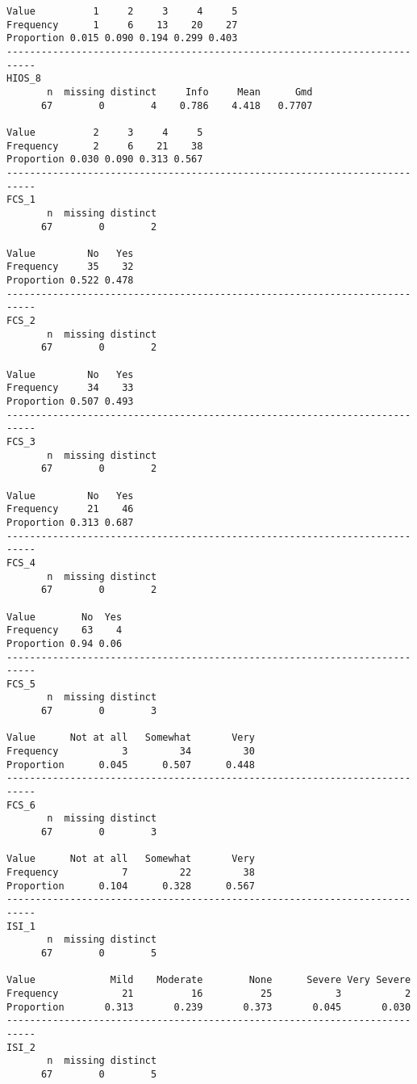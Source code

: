 \documentclass[]{article}
\begin{document}
\begin{verbatim}
Value          1     2     3     4     5
Frequency      1     6    13    20    27
Proportion 0.015 0.090 0.194 0.299 0.403
---------------------------------------------------------------------------
HIOS_8 
       n  missing distinct     Info     Mean      Gmd 
      67        0        4    0.786    4.418   0.7707 
                                  
Value          2     3     4     5
Frequency      2     6    21    38
Proportion 0.030 0.090 0.313 0.567
---------------------------------------------------------------------------
FCS_1 
       n  missing distinct 
      67        0        2 
                      
Value         No   Yes
Frequency     35    32
Proportion 0.522 0.478
---------------------------------------------------------------------------
FCS_2 
       n  missing distinct 
      67        0        2 
                      
Value         No   Yes
Frequency     34    33
Proportion 0.507 0.493
---------------------------------------------------------------------------
FCS_3 
       n  missing distinct 
      67        0        2 
                      
Value         No   Yes
Frequency     21    46
Proportion 0.313 0.687
---------------------------------------------------------------------------
FCS_4 
       n  missing distinct 
      67        0        2 
                    
Value        No  Yes
Frequency    63    4
Proportion 0.94 0.06
---------------------------------------------------------------------------
FCS_5 
       n  missing distinct 
      67        0        3 
                                           
Value      Not at all   Somewhat       Very
Frequency           3         34         30
Proportion      0.045      0.507      0.448
---------------------------------------------------------------------------
FCS_6 
       n  missing distinct 
      67        0        3 
                                           
Value      Not at all   Somewhat       Very
Frequency           7         22         38
Proportion      0.104      0.328      0.567
---------------------------------------------------------------------------
ISI_1 
       n  missing distinct 
      67        0        5 
                                                                      
Value             Mild    Moderate        None      Severe Very Severe
Frequency           21          16          25           3           2
Proportion       0.313       0.239       0.373       0.045       0.030
---------------------------------------------------------------------------
ISI_2 
       n  missing distinct 
      67        0        5 
                                                                      

\end{verbatim}
\end{document}
